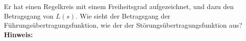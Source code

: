 \begin{question}[section=4,name={Übertragungsfunktion},difficulty=,type=mdl,tags={}]
	Er hat einen Regelkreis mit einem Freiheitsgrad aufgezeichnet, und dazu den Betragsgang von $L(s)$. Wie sieht der Betragsgang der Führungsübertragungsfunktion, wie der der Störungsübertragungsfunktion aus?
	\\ \textbf{Hinweis:}\\
	
\end{question}
\begin{solution}
	
\end{solution}